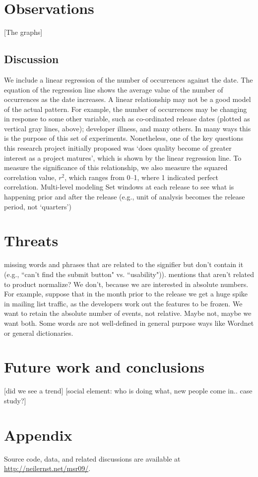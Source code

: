 \documentclass[conference, compsoc]{IEEEtran}
\begin{document}
\section{Observations}
[The graphs]
\subsection{Discussion}
We include a linear regression of the number of occurrences against the date. The equation of the regression line shows the average value of the number of occurrences as the date increases. A linear relationship may not be a good model of the actual pattern. For example, the number of occurrences may be changing in response to some other variable, such as co-ordinated release dates (plotted as vertical gray lines, above); developer illness, and many others. In many ways this is the purpose of this set of experiments. Nonetheless, one of the key questions this research project initially proposed was `does quality become of greater interest as a project matures', which is shown by the linear regression line. To measure the significance of this relationship, we also measure the squared correlation value, $r^2$, which ranges from 0--1, where 1 indicated perfect correlation.
Multi-level modeling
Set windows at each release to see what is happening prior and after the release (e.g., unit of analysis becomes the release period, not `quarters')
\section{Threats}
missing words and phrases that are related to the signifier but don't contain it (e.g., ``can't find the submit button" vs. ``usability")). 
mentions that aren't related to product
normalize? We don't, because we are interested in absolute numbers. For example, suppose that in the month prior to the release we get a huge spike in mailing list traffic, as the developers work out the features to be frozen. We want to retain the absolute number of events, not relative. Maybe not, maybe we want both.
Some words are not well-defined in general purpose ways like Wordnet or general dictionaries.
\section{Future work and conclusions}
[did we see a trend]
[social element: who is doing what, new people come in.. case study?]
\section{Appendix}
Source code, data, and related discussions are available at \url{http://neilernst.net/msr09/}.
\begin{footnotesize}

\end{footnotesize}
\end{document}
